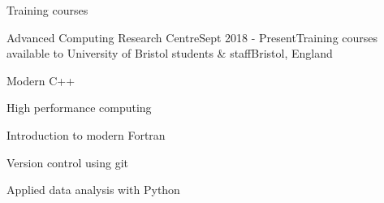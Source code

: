 \documentclass{resume} %
\begin{document}

\begin{rSection}{Training courses}
  \begin{rSubsection}{Advanced Computing Research Centre}{Sept 2018 - Present}{Training courses available to University of Bristol students \& staff}{Bristol, England}
    \item Modern C++%
    \item High performance computing%
    \item Introduction to modern Fortran
    \item Version control using git
    \item Applied data analysis with Python
  \end{rSubsection}

\end{rSection}

%
%
\end{document}
